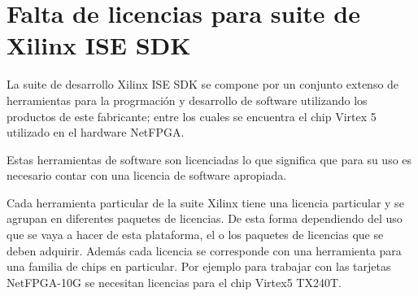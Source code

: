 



\section{Falta de licencias para suite de Xilinx ISE SDK}
\label{apendiceB3}
La suite de desarrollo Xilinx ISE SDK se compone por un conjunto extenso de herramientas para la progrmaci\'on y desarrollo de software utilizando los productos de este fabricante; entre los cuales se encuentra el chip Virtex 5 utilizado en el hardware NetFPGA.

Estas herramientas de software son licenciadas lo que significa que para su uso es necesario contar con una licencia de software apropiada.

Cada herramienta particular de la suite Xilinx tiene una licencia particular y se agrupan en diferentes paquetes de licencias. De esta forma dependiendo del uso que se vaya a hacer de esta plataforma, el o los paquetes de licencias que se deben adquirir. Adem\'as cada licencia se corresponde con una herramienta para una familia de chips en particular. Por ejemplo para trabajar con las tarjetas NetFPGA-10G se necesitan licencias para el chip Virtex5 TX240T.\\

